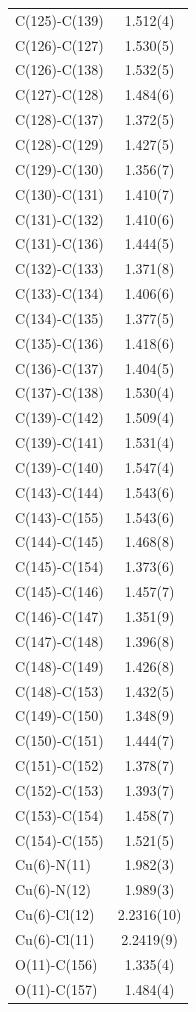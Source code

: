 \begin{center}
{\begin{supertabular}{p{1.5in}c}
C(125)-C(139) &1.512(4)\\
C(126)-C(127) &1.530(5)\\
C(126)-C(138) &1.532(5)\\
C(127)-C(128) &1.484(6)\\
C(128)-C(137) &1.372(5)\\
C(128)-C(129) &1.427(5)\\
C(129)-C(130) &1.356(7)\\
C(130)-C(131) &1.410(7)\\
C(131)-C(132) &1.410(6)\\
C(131)-C(136) &1.444(5)\\
C(132)-C(133) &1.371(8)\\
C(133)-C(134) &1.406(6)\\
C(134)-C(135) &1.377(5)\\
C(135)-C(136) &1.418(6)\\
C(136)-C(137) &1.404(5)\\
C(137)-C(138) &1.530(4)\\
C(139)-C(142) &1.509(4)\\
C(139)-C(141) &1.531(4)\\
C(139)-C(140) &1.547(4)\\
C(143)-C(144) &1.543(6)\\
C(143)-C(155) &1.543(6)\\
C(144)-C(145) &1.468(8)\\
C(145)-C(154) &1.373(6)\\
C(145)-C(146) &1.457(7)\\
C(146)-C(147) &1.351(9)\\
C(147)-C(148) &1.396(8)\\
C(148)-C(149) &1.426(8)\\
C(148)-C(153) &1.432(5)\\
C(149)-C(150) &1.348(9)\\
C(150)-C(151) &1.444(7)\\
C(151)-C(152) &1.378(7)\\
C(152)-C(153) &1.393(7)\\
C(153)-C(154) &1.458(7)\\
C(154)-C(155) &1.521(5)\\
Cu(6)-N(11) &1.982(3)\\
Cu(6)-N(12) &1.989(3)\\
Cu(6)-Cl(12) &2.2316(10)\\
Cu(6)-Cl(11) &2.2419(9)\\
O(11)-C(156) &1.335(4)\\
O(11)-C(157) &1.484(4)\\

\end{supertabular}}
\end{center}
